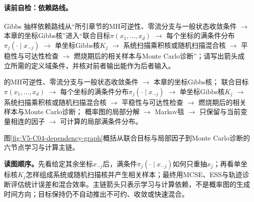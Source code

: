 \label{struct:V5-C04-CH04}
\paragraph{读前自检：依赖路线。}Gibbs 抽样依赖路线从“所引章节的MH可逆性、零流分支与一般状态收敛条件 $\to$ 本章的坐标Gibbs核”进入“联合目标$\pi(x_1,\ldots,x_d)$ $\to$ 每个坐标的满条件分布$\pi_j(\cdot\mid x_{-j})$ $\to$ 单坐标Gibbs核$K_j$ $\to$ 系统扫描乘积核或随机扫描混合核 $\to$ 平稳性与可达性检查 $\to$ 燃烧期后的相关样本与Monte Carlo诊断”；请写出箭头成立所需的定义域条件，并核对前者输出能作为后者输入。\par

\begin{dependencybox}
的MH可逆性、零流分支与一般状态收敛条件 $\to$ 本章的坐标Gibbs核；
联合目标$\pi(x_1,\ldots,x_d)$
$\to$ 每个坐标的满条件分布$\pi_j(\cdot\mid x_{-j})$
$\to$ 单坐标Gibbs核$K_j$
$\to$ 系统扫描乘积核或随机扫描混合核
$\to$ 平稳性与可达性检查
$\to$ 燃烧期后的相关样本与Monte Carlo诊断；
概率图的局部分解
$\to$ Markov毯
$\to$ 只保留与当前变量相连的因子
$\to$ 可计算的局部满条件分布。
\end{dependencybox}
图\ref{fig:V5-C04-dependency-graph}概括从联合目标与局部因子到Monte Carlo诊断的六节点学习与计算主链。

\FloatBarrier
\noindent\textbf{读图顺序。}先看给定其余坐标$x_{-j}$后，满条件$\pi_j(\cdot\mid x_{-j})$如何只重抽$x_j$；再看单坐标核$K_j$怎样组成系统或随机扫描核并产生相关样本；最终用MCSE、ESS与轨迹诊断评估统计误差和混合效率。主链箭头只表示学习与计算依赖，不是概率图的生成时间方向；目标保持仍不自动推出不可约、收敛或快速混合。\par

